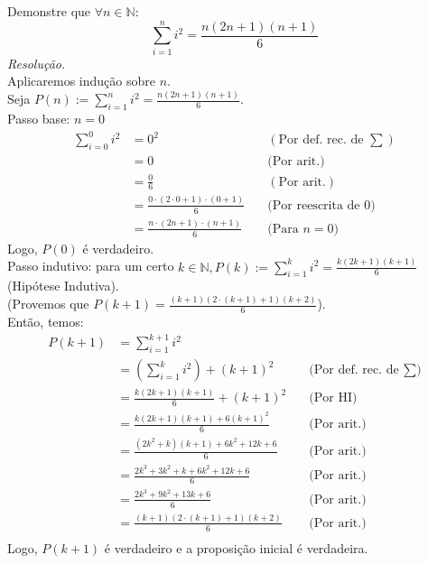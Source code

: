 Demonstre que $\forall n \in \mathbb{N}$:
\begin{displaymath}
	\sum\limits_{i=1}^n i^2 = \frac{n (2n+1) (n+1)}{6}
\end{displaymath}
\emph{Resolução.} \\
Aplicaremos indução sobre $n$. \\
Seja $P(n) := \sum\limits_{i=1}^n i^2 = \frac{n (2n+1) (n+1)}{6}$. \\
Passo base: $n = 0$
\begin{align*}
	\sum\limits_{i=0}^0 i^2 & = 0^2                                             & \quad(\text{Por def. rec. de $\sum$}) \\
	                        & = 0                                               & \quad \text{(Por arit.)}              \\
	                        & = \frac{0}{6}                                     & \quad(\text{Por arit.})               \\
	                        & = \frac{0 \cdot (2 \cdot 0 + 1) \cdot (0 + 1)}{6} & \quad \text{(Por reescrita de 0)}     \\
	                        & = \frac{n \cdot (2n + 1) \cdot (n + 1)}{6}        & \quad \text{(Para $n = 0$)}
\end{align*}
Logo, $P(0)$ é verdadeiro. \\
Passo indutivo: para um certo $k \in \mathbb{N}, P(k):= \sum\limits_{i=1}^k i^2 = \frac{k (2k+1) (k+1)}{6}$ (Hipótese Indutiva). \\
(Provemos que $P(k+1) = \frac{(k+1) (2 \cdot (k+1) + 1) (k + 2)}{6}$). \\
Então, temos:
\begin{align*}
	P(k+1) & = \sum\limits_{i=1}^{k+1} i^2                                                            \\
	       & = (\sum\limits_{i=1}^{k} i^2) + (k+1)^2         & \quad \text{(Por def. rec. de $\sum$)} \\
	       & = \frac{k (2k+1) (k+1)}{6} + (k+1)^2            & \quad \text{(Por HI)}                  \\
	       & = \frac{k (2k+1) (k+1) + 6(k+1)^2}{6}           & \quad \text{(Por arit.)}               \\
	       & = \frac{(2k^2 + k) (k+1) + 6k^2 + 12k + 6}{6}   & \quad \text{(Por arit.)}               \\
	       & = \frac{2k^3 + 3k^2 + k + 6k^2 + 12k + 6}{6}    & \quad \text{(Por arit.)}               \\
	       & = \frac{2k^3 + 9k^2 + 13k + 6}{6}               & \quad \text{(Por arit.)}               \\
	       & = \frac{(k + 1) (2 \cdot (k+1) + 1) (k + 2)}{6} & \quad \text{(Por arit.)}               \\
\end{align*}
Logo, $P(k+1)$ é verdadeiro e a proposição inicial é verdadeira.
